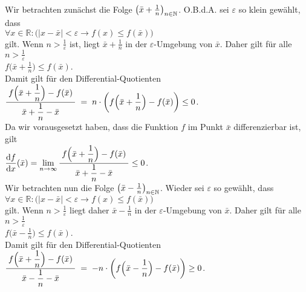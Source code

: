 \proof
Wir betrachten zun\"achst die Folge $\bigl(\bar{x} + \frac{1}{n}\bigr)_{n\in\mathbb{N}}$.
O.B.d.A. sei $\varepsilon$ so klein gew\"ahlt, dass 
\\[0.2cm]
\hspace*{1.3cm}
$\forall x \in \mathbb{R}:\bigl( |x - \bar{x}| < \varepsilon \rightarrow f(x) \leq f(\bar{x})\bigr)$
\\[0.2cm]
gilt.  Wenn $n>\frac{1}{\varepsilon}$ ist, liegt  $\bar{x} + \frac{1}{n}$ in der
$\varepsilon$-Umgebung von $\bar{x}$.  Daher gilt f\"ur alle $n > \frac{1}{\varepsilon}$
\\[0.3cm]
\hspace*{1.3cm}
 $f\bigl(\bar{x} + \frac{1}{n}\bigr) \leq f(\bar{x})$. 
\\[0.3cm]
Damit gilt f\"ur den Differential-Quotienten
\\[0.3cm]
\hspace*{1.3cm}
$\displaystyle\frac{\;\displaystyle f\Bigl(\bar{x} + \frac{1}{n}\Bigr) - f(\bar{x})\;}{\;\displaystyle\bar{x} + \frac{1}{n} - \bar{x}\;} \;=\;
 n \cdot \left(f\Bigl(\bar{x} + \frac{1}{n}\Bigr) - f(\bar{x})\right) \leq 0$. 
\\[0.3cm]
Da wir vorausgesetzt haben, dass die Funktion $f$ im Punkt $\bar{x}$ differenzierbar ist,
gilt 
\\[0.3cm]
\hspace*{1.3cm}
$\displaystyle\frac{\textrm{d}f}{\textrm{d}x}(\bar{x}) = \lim\limits_{n \rightarrow \infty} \displaystyle\frac{\;\displaystyle f\Bigl(\bar{x} + \frac{1}{n}\Bigr) - f(\bar{x})\;}{\;\displaystyle\bar{x} + \frac{1}{n} - \bar{x}\;} \leq 0$.
\\[0.3cm]
Wir betrachten nun die Folge $\bigl(\bar{x} - \frac{1}{n}\bigr)_{n\in\mathbb{N}}$.
Wieder sei $\varepsilon$ so gew\"ahlt, dass 
\\[0.2cm]
\hspace*{1.3cm}
$\forall x \in \mathbb{R}:\bigl(|x - \bar{x}| < \varepsilon \rightarrow f(x) \leq f(\bar{x})\bigr)$
\\[0.2cm]
gilt.  Wenn $n>\frac{1}{\varepsilon}$ liegt daher  $\bar{x} - \frac{1}{n}$ in der
$\varepsilon$-Umgebung von $\bar{x}$.  Daher gilt f\"ur alle $n > \frac{1}{\varepsilon}$
\\[0.3cm]
\hspace*{1.3cm} $f\bigl(\bar{x} - \frac{1}{n}\bigr) \leq f(\bar{x})$. 
\\[0.3cm]
Damit gilt f\"ur den Differential-Quotienten
\\[0.3cm]
\hspace*{1.3cm}
$\displaystyle\frac{\;\displaystyle f\Bigl(\bar{x} + \frac{1}{n}\Bigr) - f(\bar{x})\;}{\;\displaystyle\bar{x} - \frac{1}{n} - \bar{x}\;} \;=\;
 - n \cdot \left(f\Bigl(\bar{x} - \frac{1}{n}\Bigr) - f(\bar{x})\right) \geq 0$. 
